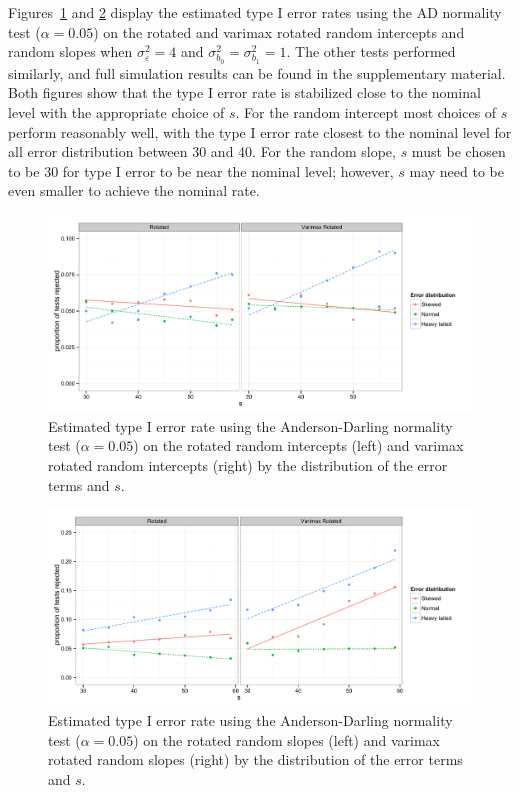 \documentclass[12pt]{article} %
\begin{document}
Figures~\ref{fig:results-int} and \ref{fig:results-slope} display the estimated type I error rates using the AD normality test ($\alpha = 0.05$) on the rotated and varimax rotated random intercepts and random slopes when $\sigma^2_\varepsilon = 4$ and $\sigma^2_{b_0} = \sigma^2_{b_1} = 1$. The other tests performed similarly, and full simulation results can be found in the supplementary material. Both figures show that the type I error rate is stabilized close to the nominal level with the appropriate choice of $s$. For the random intercept most choices of $s$ perform reasonably well, with the type I error rate closest to the nominal level for all error distribution between 30 and 40. For the random slope, $s$ must be chosen to be 30 for type I error to be near the nominal level; however, $s$ may need to be even smaller to achieve the nominal rate. 

\begin{figure}
	\centering
	\includegraphics[width=\textwidth]{ad_intercept_results.pdf}
	\caption{\label{fig:results-int} Estimated type I error rate using the Anderson-Darling normality test ($\alpha = 0.05$) on the rotated random intercepts (left) and varimax rotated random intercepts (right) by the distribution of the error terms and $s$. }
\end{figure}

\begin{figure}
	\centering
	\includegraphics[width=\textwidth]{ad_slope_results.pdf}
	\caption{\label{fig:results-slope} Estimated type I error rate using the Anderson-Darling normality test ($\alpha = 0.05$) on the rotated random slopes (left) and varimax rotated random slopes (right) by the distribution of the error terms and $s$.}
\end{figure}
\end{document}
